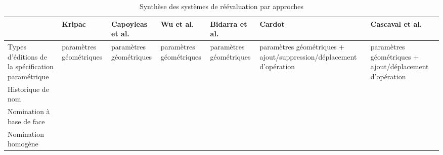 \begin{table}
	\centering
	\small
	\caption{Synthèse des systèmes de réévaluation par approches}
	\label{tab:etat-art-modelisation-parametrique-synthes-systemes-approches}
	\begin{tabularx}{\textwidth}{|p{4.55cm}||Y|Y|Y|Y|Y|Y|}
		\bottomrule%
		 & Kripac                  & Capoyleas et al.        & Wu et al.               & Bidarra et al.          & Cardot                                                              & Cascaval et al.                                         \\
		\toprule %
		\bottomrule %
		 Types d'éditions de la spécification paramétrique                                    & paramètres géométriques & paramètres géométriques & paramètres géométriques & paramètres géométriques & paramètres géométriques + ajout/suppression/déplacement d'opération & paramètres géométriques + ajout/déplacement d'opération \\
		\hline
		Historique de nom                                                                    & \cmark                  & \cmark                  & \cmark                  & \xmark                  & \cmark                                                              & \cmark                                                  \\
		\hline
		Nomination  à base de face                                                           & \cmark                  & \cmark                  & \cmark                  & \cmark                  & \xmark                                                              & \xmark                                                  \\
		\hline
		Nomination  homogène                                                                 & \xmark                  & \xmark                  & \xmark                  & \xmark                  & \cmark                                                              & \cmark                                                  \\
		\hline

\end{tabularx}
\end{table}
